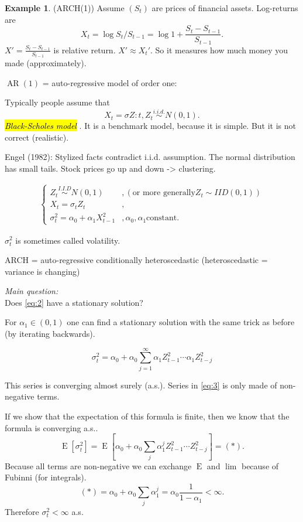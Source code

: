 \documentclass[12pt,a4paper, notitlepage]{book}
\newcommand{\hlc}[2][yellow]{ {\sethlcolor{#1} \hl{#2}} }
\theoremstyle{definition} %
\newtheorem{example}{Example}[chapter]
\theoremstyle{plain} %
\DeclareMathOperator{\E}{E}
\DeclareMathOperator{\Ar}{AR}
\newcommand{\Important}[1]{ {\it \hlc{#1} } }
\newcommand{\QuestionStart}[1]{ {\it \sc #1} } %
\begin{document}
\begin{example}(ARCH(1))
Assume $(S_t)$ are prices of financial assets. Log-returns are 
\[X_t = \log{S_t / S_{t-1}} = \log{1 + \frac{S_t - S_{t-1}}{S_{t-1}}}. \]
 $ X' = \frac{S_t - S_{t-1}}{S_{t-1}} $ is relative return. 
$ X' \approx X_t'$. So it measures how much money you made (approximately).

$\Ar(1)$ = auto-regressive model of order one:

Typically people assume that 
\[ X_t = \sigma Z:t ,  Z_t  \overset{i.i.d.}{\sim} N(0,1). \]
 \Important{Black-Scholes model}. It is a benchmark model, because it is simple. But it is not correct (realistic).



Engel (1982):
Stylized facts contradict i.i.d. assumption. The normal distribution has small tails. Stock prices go up and down -> clustering.


\begin{align}
\begin{cases}
Z_t \overset{I.I.D}{\sim}  N(0,1) & , ( \text{or more generally} Z_t \sim IID(0,1) ) \\
X_t = \sigma_t Z_t & , \\
\sigma_t^2 = \alpha_0 + \alpha_1 X_{t-1}^2 &, \alpha_0, \alpha_1 \text{constant}. 
\end{cases}
\label{eq:2}
\end{align}

$\sigma_t^2$ is sometimes called volatility.
 

ARCH = auto-regressive conditionally heteroscedastic (heteroscedastic = variance is changing)

\QuestionStart{Main question:}  \\ Does 
\ref{eq:2} have a stationary solution? 

For $\alpha_1 \in (0,1)$ one can find a stationary solution with the same trick as before (by iterating backwards).

\[ \sigma_t^2 = \alpha_0 + \alpha_0 \sum_{j = 1}^\infty \alpha_1 Z_{t-1}^2 \cdots \alpha_1Z_{t-j}^2 
\label{eq:3} \] 



This series is converging almost surely (a.s.). 
Series in 
\ref{eq:3} is only made of non-negative terms. 

If we show that the expectation of this formula is finite, then we know that the formula is converging a.s..
\[ \E[ \sigma_t^2] = \E\left[\alpha_0 + \alpha_0 \sum_j \alpha_1^j Z_{t-1}^2 \cdots Z_{t-j}^2 \right]  = (*). \]
Because all terms are non-negative we can exchange $ \E$ and  $\lim$ because of Fubinni (for integrals).
\[ (*) = \alpha_0 + \alpha_0 \sum_j \alpha_1^j = \alpha_0 \frac{1}{1-\alpha_1} < \infty. \]
 Therefore $\sigma_t^2 < \infty$ a.s.


\end{example}
\end{document}
